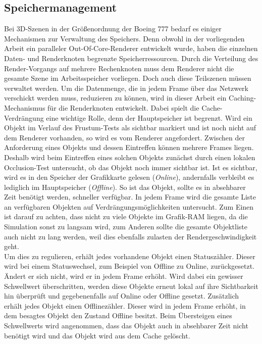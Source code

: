 \subsection{Speichermanagement}
\label{sec:basics:speicher}
Bei 3D-Szenen in der Größenordnung der Boeing 777 bedarf es einiger Mechanismen zur Verwaltung des Speichers. Denn obwohl in der vorliegenden Arbeit ein paralleler Out-Of-Core-Renderer entwickelt wurde, haben die einzelnen Daten- und Renderknoten begrenzte Speicherressourcen. Durch die Verteilung des Render-Vorgangs auf mehrere Rechenknoten muss dem Renderer nicht die gesamte Szene im Arbeitsspeicher vorliegen. Doch auch diese Teilszenen müssen verwaltet werden. Um die Datenmenge, die in jedem Frame über das Netzwerk verschickt werden muss, reduzieren zu können, wird in dieser Arbeit ein Caching-Mechanismus für die Renderknoten entwickelt. Dabei spielt die Cache-Verdrängung eine wichtige Rolle, denn der Hauptspeicher ist begrenzt. Wird ein Objekt im Verlauf des Frustum-Tests als sichtbar markiert und ist noch nicht auf dem Renderer vorhanden, so wird es vom Renderer angefordert. Zwischen der Anforderung eines Objekts und dessen Eintreffen können mehrere Frames liegen. Deshalb wird beim Eintreffen eines solchen Objekts zunächst durch einen lokalen Occlusion-Test untersucht, ob das Objekt noch immer sichtbar ist. Ist es sichtbar, wird es in den Speicher der Grafikkarte gelesen (\textit{Online}), andernfalls verbleibt es lediglich im Hauptspeicher (\textit{Offline}). So ist das Objekt, sollte es in absehbarer Zeit benötigt werden, schneller verfügbar. In jedem Frame wird die gesamte Liste an verfügbaren Objekten auf Verdrängungsmöglichkeiten untersucht. Zum Einen ist darauf zu achten, dass nicht zu viele Objekte im Grafik-RAM liegen, da die Simulation sonst zu langsam wird, zum Anderen sollte die gesamte Objektliste auch nicht zu lang werden, weil dies ebenfalls zulasten der Rendergeschwindigkeit geht.\\
Um dies zu regulieren, erhält jedes vorhandene Objekt einen Statuszähler. Dieser wird bei einem Statuswechsel, zum Beispiel von Offline zu Online, zurückgesetzt. Ändert er sich nicht, wird er in jedem Frame erhöht. Wird dabei ein gewisser Schwellwert überschritten, werden diese Objekte erneut lokal auf ihre Sichtbarkeit hin überprüft und gegebenenfalls auf Online oder Offline gesetzt. Zusätzlich erhält jedes Objekt einen Offlinezähler. Dieser wird in jedem Frame erhöht, in dem besagtes Objekt den Zustand Offline besitzt. Beim Übersteigen eines Schwellwerts wird angenommen, dass das Objekt auch in absehbarer Zeit nicht benötigt wird und das Objekt wird aus dem Cache gelöscht.
